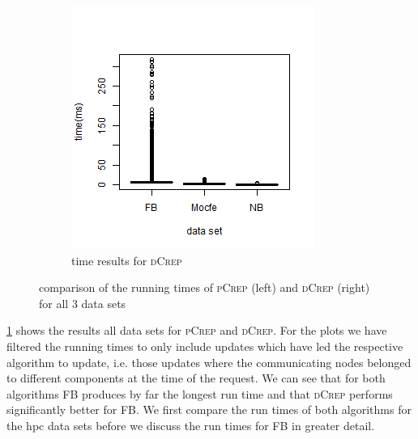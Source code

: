 \documentclass[a4paper,UKenglish,cleveref, autoref, thm-restate,authorcolumns]{lipics-v2019}
\newcommand{\adjDel}{\textsc{pCrep}}
\newcommand{\directDecomp}{\textsc{dCrep}}
\newcommand{\fb}{FB}
\begin{document}
\begin{figure}[h]
\begin{minipage}{0.48\linewidth}
\begin{subfigure}[b]{\linewidth}
			\includegraphics*[width=\linewidth]{"plots/time_all_filtered_compDecomp"}
			\caption{time results for \directDecomp}
		\end{subfigure}		
	\end{minipage}
	\caption{comparison of the running times of \adjDel{} (left) and \directDecomp{} (right) for all 3 data sets}\label{fig:all_runtimes_boxplot}
\end{figure}

\cref{fig:all_runtimes_boxplot} shows the results all data sets for \adjDel{} and \directDecomp{}. For the plots we have filtered the running times to only include updates which have led the respective algorithm to update, i.e. those updates where the communicating nodes belonged to different components at the time of the request. 
We can see that for both algorithms \fb{} produces by far the longest run time and that \directDecomp{} performs significantly better for \fb{}.
We first compare the run times of both algorithms for the hpc data sets before we discuss the run times for \fb{} in greater detail.
\end{document}
